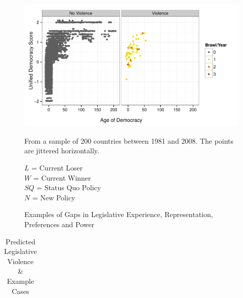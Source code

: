 \documentclass[a4paper]{article}\usepackage{graphicx, color}
\newenvironment{knitrout}{}{} %
\begin{document}
{{\begin{figure}
\begin{center}
\begin{knitrout}
\color{fgcolor}
\includegraphics[width=0.8\linewidth]{figure/ScatterDem} 

\end{knitrout}


  \end{center}
    \begin{singlespace}
        {\scriptsize{From a sample of 200 countries between 1981 and 2008. The points are jittered horizontally.}}
    \end{singlespace}
\end{figure}

\begin{figure}[h!]
    \caption{Examples of Gaps in Legislative Experience, Representation, Preferences and Power}
    \label{example_gaps}
    \begin{center}

        

    \end{center}
        \begin{singlespace}
        {\scriptsize{$L$ = Current Loser \\
                        $W$ = Current Winner \\
                        $SQ$ = Status Quo Policy \\
                        $N$ = New Policy
                    }}
    \end{singlespace}

\end{figure}


\begin{table}[!h]
    \begin{center}
    \caption{Predicted Legislative Violence \& Example Cases}
    \label{leg.v.framework}
    \begin{tabular}{c | c c}
        

\end{tabular}
\end{center}
\end{table}}}
\end{document}

